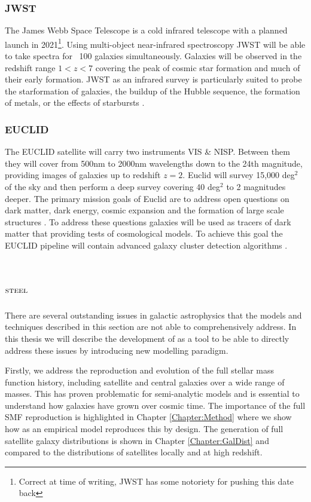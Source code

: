 \subsubsection{JWST \cite{JamesNASA}}

The James Webb Space Telescope is a cold infrared telescope with a planned launch in 2021\footnote{Correct at time of writing, JWST has some notoriety for pushing this date back}. Using multi-object near-infrared spectroscopy JWST will be able to take spectra for ~100 galaxies simultaneously. Galaxies will be observed in the redshift range $1 < z < 7$ covering the peak of cosmic star formation and much of their early formation. JWST as an infrared survey is particularly suited to probe the starformation of galaxies, the buildup of the Hubble sequence, the formation of metals, or the effects of starbursts \cite{Windhorst2009JWST2009}.  


\subsubsection{EUCLID}

The EUCLID satellite will carry two instruments VIS \& NISP. Between them they will cover from 500nm to 2000nm wavelengths down to the 24th magnitude, providing images of galaxies up to redshift $z = 2$. Euclid will survey 15,000 deg$^2$ of the sky and then perform a deep survey covering 40 deg$^2$ to 2 magnitudes deeper. The primary mission goals of Euclid are to address open questions on dark matter, dark energy, cosmic expansion and the formation of large scale structures \cite{Amendola2018CosmologySatellite}. To address these questions galaxies will be used as tracers of dark matter that providing tests of cosmological models. To achieve this goal the EUCLID pipeline will contain advanced galaxy cluster detection algorithms \cite{Adam2019EuclidSelection}.


\section{$\textsc{steel}$}

There are several outstanding issues in galactic astrophysics that the models and techniques described in this section are not able to comprehensively address. In this thesis we will describe the development of \steel as a tool to be able to directly address these issues by introducing new modelling paradigm. 


Firstly, we address the reproduction and evolution of the full stellar mass function history, including satellite and central galaxies over a wide range of masses. This has proven problematic for semi-analytic models \cite{Asquith2018CosmicModels} and is essential to understand how galaxies have grown over cosmic time.
The importance of the full SMF reproduction is highlighted in Chapter \ref{Chapter:Method} where we show how \steel as an empirical model reproduces this by design. The generation of full satellite galaxy distributions is shown in Chapter \ref{Chapter:GalDist} and compared to the distributions of satellites locally and at high redshift. 

